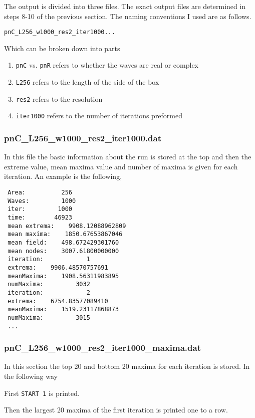\documentclass[12pt]{article}
\begin{document}
The output is divided into three files. The exact output files are determined in steps 8-10 of the previous section. The naming conventions I used are as follows.

\verb|pnC_L256_w1000_res2_iter1000...|

Which can be broken down into parts

\begin{enumerate}
	\item \verb|pnC| vs. \verb|pnR| refers to whether the waves are real or complex
	\item \verb|L256| refers to the length of the side of the box
	\item \verb|res2| refers to the resolution
	\item \verb|iter1000| refers to the number of iterations preformed
\end{enumerate}

\subsubsection{pnC\_L256\_w1000\_res2\_iter1000.dat}

In this file the basic information about the run is stored at the top and then the extreme value, mean maxima value and number of maxima is given for each iteration. An example is the following,

\begin{verbatim}
 Area:          256
 Waves:         1000
 iter:         1000
 time:        46923
 mean extrema:    9908.12088962809     
 mean maxima:    1850.67653867046     
 mean field:    498.672429301760     
 mean nodes:    3007.61800000000     
 iteration:            1
 extrema:    9906.48570757691     
 meanMaxima:    1908.56311983895     
 numMaxima:         3032
 iteration:            2
 extrema:    6754.83577089410     
 meanMaxima:    1519.23117868873     
 numMaxima:         3015
 ...
\end{verbatim}

\subsubsection{pnC\_L256\_w1000\_res2\_iter1000\_maxima.dat}

In this section the top 20 and bottom 20 maxima for each iteration is stored. In the following way

First \verb|START 1| is printed.

Then the largest 20 maxima of the first iteration is printed one to a row.
\end{document}
